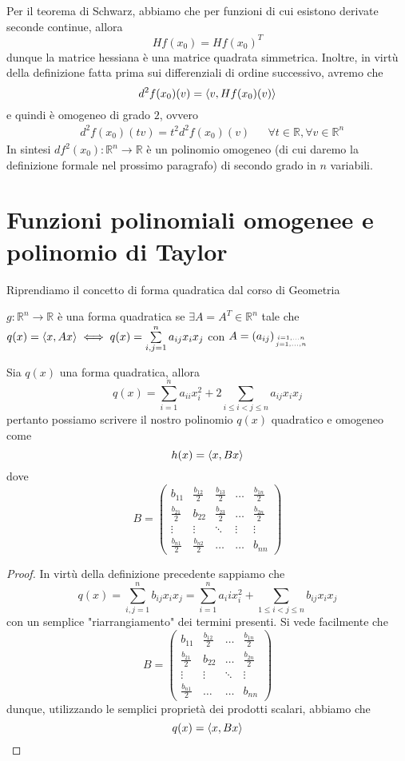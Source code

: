 \documentclass[openany, italian]{book}
\begin{document}
Per il teorema di Schwarz, abbiamo che per funzioni di cui esistono derivate seconde continue, allora 
$$
Hf(x_0) = Hf(x_0)^T
$$
dunque la matrice hessiana è una matrice quadrata simmetrica. Inoltre, in virtù della definizione fatta prima sui differenziali di ordine successivo, avremo che
$$
d^2 f(x_0)(v) = \langle v, Hf(x_0)(v) \rangle
$$
e quindi è omogeneo di grado $2$, ovvero
\begin{align*}
&d^2 f(x_0)(tv) = t^2 d^2 f(x_0)(v) & &\forall t \in \mathbb{R}, \forall v \in \mathbb{R}^n
\end{align*}
In sintesi $df^2 (x_0): \mathbb{R}^n \to \mathbb{R}$ è un polinomio omogeneo (di cui daremo la definizione formale nel prossimo paragrafo) di secondo grado in $n$ variabili. \\
\section{Funzioni polinomiali omogenee e polinomio di Taylor}
Riprendiamo il concetto di forma quadratica dal corso di Geometria
\begin{definition}
$g: \mathbb{R}^n \to \mathbb{R}$ è una forma quadratica se $\exists A = A^T \in \mathbb{R}^n$ tale che $q(x)=\langle x, Ax \rangle \iff q(x) = \sum\limits_{i,j=1}^n a_{ij}x_i x_j$ con $A = (a_{ij})_{i=1, \ldots n \atop j=1, \ldots, n}$
\end{definition}
\begin{prop}
Sia $q(x)$ una forma quadratica, allora 
$$
q(x) = \sum_{i=1}^n a_{ii}x_i^2 + 2 \sum_{i \leq i < j \leq n} a_{ij} x_i x_j
$$
pertanto possiamo scrivere il nostro polinomio $q(x)$ quadratico e omogeneo come
$$
h(x) = \langle x, Bx \rangle
$$
dove
\begin{equation*}
B = \begin{pmatrix}
b_{11} & \frac{b_{12}}{2} & \frac{b_{13}}{2} & \ldots & \frac{b_{1n}}{2} \\
\frac{b_{21}}{2} & b_{22} & \frac{b_{23}}{2} & \ldots & \frac{b_{2n}}{2} \\
\vdots & \vdots & \ddots & \vdots & \vdots \\
\frac{b_{n1}}{2} & \frac{b_{n2}}{2} & \ldots & \ldots & b_{nn}
\end{pmatrix}
\end{equation*}
\end{prop}
\begin{proof}
In virtù della definizione precedente sappiamo che 
$$
q(x) = \sum_{i, j=1}^n b_{ij} x_i x_j = \sum_{i=1}^n a_ii x_i^2 + \sum_{1 \leq i < j \leq n} b_{ij} x_i x_j 
$$
con un semplice "riarrangiamento" dei termini presenti. Si vede facilmente che
$$
B = \begin{pmatrix}
b_{11} & \frac{b_{12}}{2} & \ldots & \frac{b_{1n}}{2} \\
\frac{b_{21}}{2} & b_{22} & \ldots & \frac{b_{2n}}{2} \\
\vdots & \vdots & \ddots & \vdots \\
\frac{b_{n1}}{2} & \ldots & \ldots & b_{nn}
\end{pmatrix}
$$
dunque, utilizzando le semplici proprietà dei prodotti scalari, abbiamo che
$$
 q(x) = \langle x, Bx \rangle
$$
\end{proof}
\end{document}
